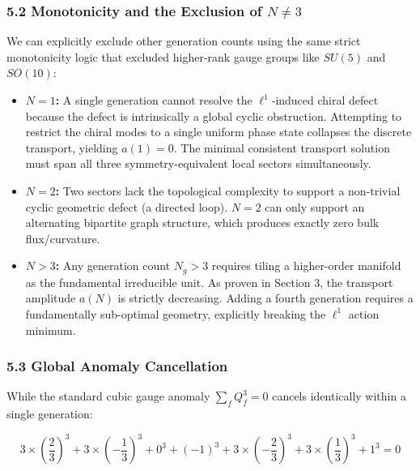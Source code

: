 \documentclass[
]{article}
\providecommand{\tightlist}{%
  \setlength{\itemsep}{0pt}\setlength{\parskip}{0pt}}
\begin{document}
\hypertarget{monotonicity-and-the-exclusion-of-n-neq-3}{%
\subsubsection{\texorpdfstring{5.2 Monotonicity and the Exclusion of
\(N \neq 3\)}{5.2 Monotonicity and the Exclusion of N \textbackslash neq 3}}\label{monotonicity-and-the-exclusion-of-n-neq-3}}

We can explicitly exclude other generation counts using the same strict
monotonicity logic that excluded higher-rank gauge groups like \(SU(5)\)
and \(SO(10)\):

\begin{itemize}
\tightlist
\item
  \textbf{\(N = 1\):} A single generation cannot resolve the
  \(\ell^1\)-induced chiral defect because the defect is intrinsically a
  global cyclic obstruction. Attempting to restrict the chiral modes to
  a single uniform phase state collapses the discrete transport,
  yielding \(a(1) = 0\). The minimal consistent transport solution must
  span all three symmetry-equivalent local sectors simultaneously.
\item
  \textbf{\(N = 2\):} Two sectors lack the topological complexity to
  support a non-trivial cyclic geometric defect (a directed loop).
  \(N=2\) can only support an alternating bipartite graph structure,
  which produces exactly zero bulk flux/curvature.
\item
  \textbf{\(N > 3\):} Any generation count \(N_g > 3\) requires tiling a
  higher-order manifold as the fundamental irreducible unit. As proven
  in Section 3, the transport amplitude \(a(N)\) is strictly decreasing.
  Adding a fourth generation requires a fundamentally sub-optimal
  geometry, explicitly breaking the \(\ell^1\) action minimum.
\end{itemize}

\hypertarget{global-anomaly-cancellation}{%
\subsubsection{5.3 Global Anomaly
Cancellation}\label{global-anomaly-cancellation}}

While the standard cubic gauge anomaly \(\sum_f Q_f^3 = 0\) cancels
identically within a single generation:

\[3 \times \left(\frac{2}{3}\right)^3 + 3 \times \left(-\frac{1}{3}\right)^3 + 0^3 + (-1)^3 + 3 \times \left(-\frac{2}{3}\right)^3 + 3 \times \left(\frac{1}{3}\right)^3 + 1^3 = 0\]
\end{document}
